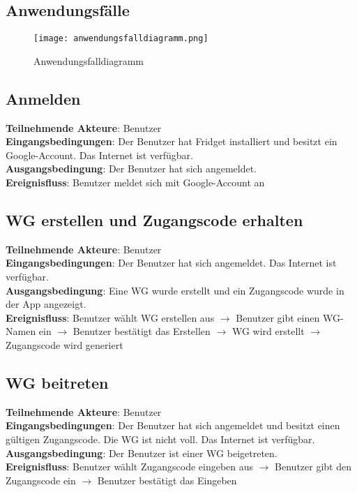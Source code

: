 \begin{flushleft}
        \section{Anwendungsfälle}
        	\begin{figure}[H]
        		\centering
        		\texttt{[image: anwendungsfalldiagramm.png]}
        		\caption{Anwendungsfalldiagramm}
        	\end{figure}
        
        \clearpage
        	
        	\subsection{Anmelden}
        \textbf{Teilnehmende Akteure}: Benutzer \\
		\textbf{Eingangsbedingungen}: Der Benutzer hat Fridget installiert und besitzt ein Google-Account. Das Internet ist verfügbar. \\
		\textbf{Ausgangsbedingung}: Der Benutzer hat sich angemeldet. \\
		\textbf{Ereignisfluss}: Benutzer meldet sich mit Google-Account an
		
		\subsection{WG erstellen und Zugangscode erhalten}
		\textbf{Teilnehmende Akteure}: Benutzer \\
		\textbf{Eingangsbedingungen}: Der Benutzer hat sich angemeldet. Das Internet ist verfügbar. \\
		\textbf{Ausgangsbedingung}: Eine WG wurde erstellt und ein Zugangscode wurde in der App angezeigt. \\
		\textbf{Ereignisfluss}: Benutzer wählt WG erstellen aus $\rightarrow$ Benutzer gibt einen WG-Namen ein $\rightarrow$ Benutzer bestätigt das Erstellen $\rightarrow$ WG wird erstellt $\rightarrow$ Zugangscode wird generiert
		
		\subsection{WG beitreten}
		\textbf{Teilnehmende Akteure}: Benutzer \\
		\textbf{Eingangsbedingungen}: Der Benutzer hat sich angemeldet und besitzt einen gültigen Zugangscode. Die WG ist nicht voll. Das Internet ist verfügbar. \\
		\textbf{Ausgangsbedingung}: Der Benutzer ist einer WG beigetreten. \\
		\textbf{Ereignisfluss}: Benutzer wählt Zugangscode eingeben aus $\rightarrow$ Benutzer gibt den Zugangscode ein $\rightarrow$ Benutzer bestätigt das Eingeben
		

\end{flushleft}

